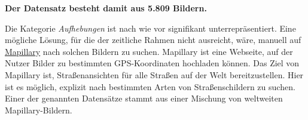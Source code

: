 \begin{center}
\textbf{Der Datensatz besteht damit aus 5.809 Bildern.}
\end{center}

Die Kategorie \emph{Aufhebungen} ist nach wie vor signifikant unterrepräsentiert. Eine mögliche Lösung, für die der zeitliche Rahmen nicht ausreicht, wäre, manuell auf \href{https://www.mapillary.com/}{Mapillary} nach solchen Bildern zu suchen. Mapillary ist eine Webseite, auf der Nutzer Bilder zu bestimmten GPS-Koordinaten hochladen können. Das Ziel von Mapillary ist, Straßenansichten für alle Straßen auf der Welt bereitzustellen. Hier ist es möglich, explizit nach bestimmten Arten von Straßenschildern zu suchen. Einer der genannten Datensätze stammt aus einer Mischung von weltweiten Mapillary-Bildern. \cite{dataset-mapillary}
